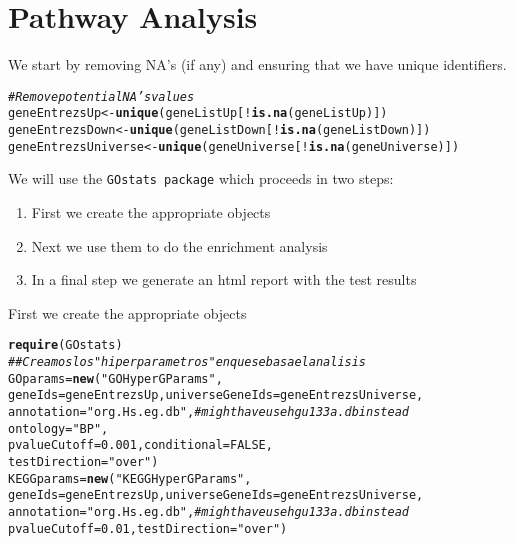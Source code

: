 \documentclass{article}\usepackage[]{graphicx}\usepackage[]{color}
\makeatletter
\newcommand{\hlnum}[1]{\textcolor[rgb]{0.686,0.059,0.569}{#1}}%
\newcommand{\hlstr}[1]{\textcolor[rgb]{0.192,0.494,0.8}{#1}}%
\newcommand{\hlcom}[1]{\textcolor[rgb]{0.678,0.584,0.686}{\textit{#1}}}%
\newcommand{\hlopt}[1]{\textcolor[rgb]{0,0,0}{#1}}%
\newcommand{\hlstd}[1]{\textcolor[rgb]{0.345,0.345,0.345}{#1}}%
\newcommand{\hlkwb}[1]{\textcolor[rgb]{0.69,0.353,0.396}{#1}}%
\newcommand{\hlkwc}[1]{\textcolor[rgb]{0.333,0.667,0.333}{#1}}%
\newcommand{\hlkwd}[1]{\textcolor[rgb]{0.737,0.353,0.396}{\textbf{#1}}}%
\newenvironment{kframe}{%
 \def\at@end@of@kframe{}%
 \ifinner\ifhmode%
  \def\at@end@of@kframe{\end{minipage}}%
  \begin{minipage}{\columnwidth}%
 \fi\fi%
 \def\FrameCommand##1{\hskip\@totalleftmargin \hskip-\fboxsep
 \colorbox{shadecolor}{##1}\hskip-\fboxsep
     \hskip-\linewidth \hskip-\@totalleftmargin \hskip\columnwidth}%
 \MakeFramed {\advance\hsize-\width
   \@totalleftmargin\z@ \linewidth\hsize
   \@setminipage}}%
 {\par\unskip\endMakeFramed%
 \at@end@of@kframe}
\newenvironment{knitrout}{}{} %
\makeatother
\begin{document}
\section{Pathway Analysis}

We start by removing NA's (if any) and ensuring that we have unique identifiers.

\begin{knitrout}
\color{fgcolor}\begin{kframe}
\begin{alltt}
\hlcom{# Remove potential NA's values}
\hlstd{geneEntrezsUp} \hlkwb{<-} \hlkwd{unique}\hlstd{(geneListUp[}\hlopt{!}\hlkwd{is.na}\hlstd{(geneListUp)])}
\hlstd{geneEntrezsDown} \hlkwb{<-} \hlkwd{unique}\hlstd{(geneListDown[}\hlopt{!}\hlkwd{is.na}\hlstd{(geneListDown)])}
\hlstd{geneEntrezsUniverse} \hlkwb{<-} \hlkwd{unique}\hlstd{(geneUniverse[}\hlopt{!}\hlkwd{is.na}\hlstd{(geneUniverse)])}
\end{alltt}
\end{kframe}
\end{knitrout}

We will use the \texttt{GOstats package} which proceeds in two steps:
\begin{enumerate}
  \item First we create the appropriate objects
  \item Next we use them to do the enrichment analysis
  \item In a final step we generate an html report with the test results
\end{enumerate}

First we create the appropriate objects
\begin{knitrout}
\color{fgcolor}\begin{kframe}
\begin{alltt}
\hlkwd{require}\hlstd{(GOstats)}
\hlcom{## Creamos los "hiperparametros" en que se basa el analisis}
\hlstd{GOparams} \hlkwb{=} \hlkwd{new}\hlstd{(}\hlstr{"GOHyperGParams"}\hlstd{,}
               \hlkwc{geneIds}\hlstd{=geneEntrezsUp,} \hlkwc{universeGeneIds}\hlstd{=geneEntrezsUniverse,}
               \hlkwc{annotation}\hlstd{=}\hlstr{"org.Hs.eg.db"}\hlstd{,} \hlcom{# might have use hgu133a.db instead}
               \hlkwc{ontology}\hlstd{=}\hlstr{"BP"}\hlstd{,}
               \hlkwc{pvalueCutoff}\hlstd{=}\hlnum{0.001}\hlstd{,} \hlkwc{conditional}\hlstd{=}\hlnum{FALSE}\hlstd{,}
               \hlkwc{testDirection}\hlstd{=}\hlstr{"over"}\hlstd{)}
\hlstd{KEGGparams} \hlkwb{=} \hlkwd{new}\hlstd{(}\hlstr{"KEGGHyperGParams"}\hlstd{,}
                 \hlkwc{geneIds}\hlstd{=geneEntrezsUp,} \hlkwc{universeGeneIds}\hlstd{=geneEntrezsUniverse,}
                 \hlkwc{annotation}\hlstd{=}\hlstr{"org.Hs.eg.db"}\hlstd{,} \hlcom{# might have use hgu133a.db instead}
                 \hlkwc{pvalueCutoff}\hlstd{=}\hlnum{0.01}\hlstd{,} \hlkwc{testDirection}\hlstd{=}\hlstr{"over"}\hlstd{)}
\end{alltt}
\end{kframe}
\end{knitrout}
\end{document}
